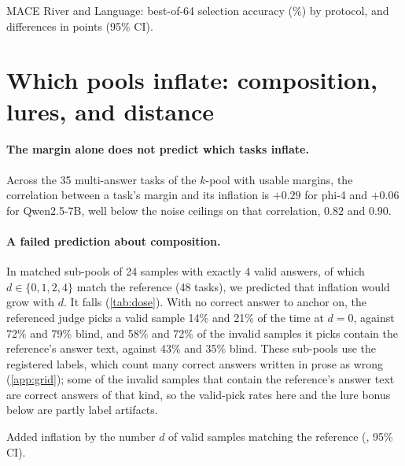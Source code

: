\begin{table}[htbp]
\centering
\caption{\textsc{MACE} River and Language: best-of-64 selection accuracy (\%) by protocol, and differences in points (95\% CI).\pre}
\label{tab:mace-accuracy}
\footnotesize
\setlength{\tabcolsep}{3pt}
\begin{adjustbox}{max width=\linewidth}\end{adjustbox}

\end{table}

\FloatBarrier
\section{Which pools inflate: composition, lures, and distance}
\label{app:composition}

\paragraph{The margin alone does not predict which tasks inflate.}
Across the 35 multi-answer tasks of the $k$-pool with usable margins, the correlation between a task's margin and its inflation is $+0.29$ for phi-4 and $+0.06$ for Qwen2.5-7B, well below the noise ceilings on that correlation, $0.82$ and $0.90$.

\paragraph{A failed prediction about composition.}
In matched sub-pools of 24 samples with exactly 4 valid answers, of which $d \in \{0,1,2,4\}$ match the reference (48 tasks), we predicted that inflation would grow with $d$. It falls (\cref{tab:dose}). With no correct answer to anchor on, the referenced judge picks a valid sample 14\% and 21\% of the time at $d{=}0$, against 72\% and 79\% blind, and 58\% and 72\% of the invalid samples it picks contain the reference's answer text, against 43\% and 35\% blind. These sub-pools use the registered labels, which count many correct answers written in prose as wrong (\cref{app:grid}); some of the invalid samples that contain the reference's answer text are correct answers of that kind, so the valid-pick rates here and the lure bonus below are partly label artifacts.

\begin{table}[htbp]
\centering
\caption{Added inflation by the number $d$ of valid samples matching the reference (\sd, 95\% CI).\pre}
\label{tab:dose}
\footnotesize
\begin{adjustbox}{max width=\linewidth}\end{adjustbox}

\end{table}

